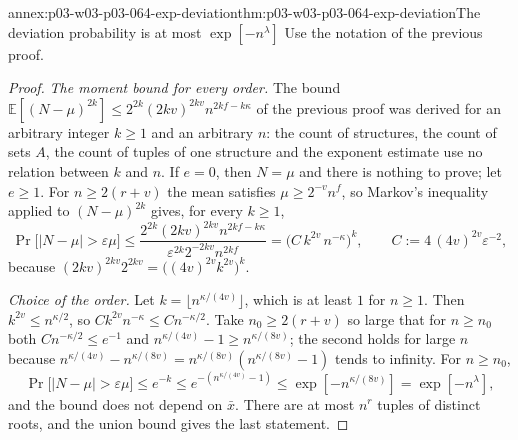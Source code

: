 \begin{annexitem}{annex:p03-w03-p03-064-exp-deviation}{thm:p03-w03-p03-064-exp-deviation}{The deviation probability is at most \(\exp[-n^{\lambda}]\)}
Use the notation of the previous proof.
\begin{proof}
\emph{The moment bound for every order.}  The bound
\(\mathbb E[(N-\mu)^{2k}]\leq2^{2k}(2kv)^{2kv}n^{2kf-k\kappa}\) of the
previous proof was derived for an arbitrary integer \(k\geq1\) and an
arbitrary \(n\): the count of structures, the count of sets \(A\), the count
of tuples of one structure and the exponent estimate use no relation between
\(k\) and \(n\).  If \(e=0\), then \(N=\mu\) and there is nothing to prove;
let \(e\geq1\).  For \(n\geq2(r+v)\) the mean satisfies
\(\mu\geq2^{-v}n^f\), so Markov's inequality applied to \((N-\mu)^{2k}\)
gives, for every \(k\geq1\),
\[
  \Pr\bigl[|N-\mu|>\varepsilon\mu\bigr]
  \leq\frac{2^{2k}(2kv)^{2kv}n^{2kf-k\kappa}}{\varepsilon^{2k}2^{-2kv}n^{2kf}}
  =\bigl(C\,k^{2v}\,n^{-\kappa}\bigr)^k,
  \qquad C:=4\,(4v)^{2v}\varepsilon^{-2},
\]
because \((2kv)^{2kv}2^{2kv}=\bigl((4v)^{2v}k^{2v}\bigr)^k\).

\emph{Choice of the order.}  Let \(k=\lfloor n^{\kappa/(4v)}\rfloor\), which
is at least \(1\) for \(n\geq1\).  Then \(k^{2v}\leq n^{\kappa/2}\), so
\(Ck^{2v}n^{-\kappa}\leq Cn^{-\kappa/2}\).  Take \(n_0\geq2(r+v)\) so large
that for \(n\geq n_0\) both \(Cn^{-\kappa/2}\leq e^{-1}\) and
\(n^{\kappa/(4v)}-1\geq n^{\kappa/(8v)}\); the second holds for large \(n\)
because \(n^{\kappa/(4v)}-n^{\kappa/(8v)}=n^{\kappa/(8v)}(n^{\kappa/(8v)}-1)\)
tends to infinity.  For \(n\geq n_0\),
\[
  \Pr\bigl[|N-\mu|>\varepsilon\mu\bigr]\leq e^{-k}\leq
  e^{-(n^{\kappa/(4v)}-1)}\leq\exp[-n^{\kappa/(8v)}]=\exp[-n^{\lambda}],
\]
and the bound does not depend on \(\bar x\).  There are at most \(n^r\)
tuples of distinct roots, and the union bound gives the last statement.
\end{proof}
\end{annexitem}

